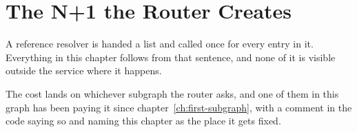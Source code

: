 \chapter{The N+1 the Router Creates}
\label{ch:router-n-plus-1}

A reference resolver is handed a list and called once for every entry in it.
Everything in this chapter follows from that sentence, and none of it is
visible outside the service where it happens.

The cost lands on whichever subgraph the router asks, and one of them in this
graph has been paying it since chapter~\ref{ch:first-subgraph}, with a comment
in the code saying so and naming this chapter as the place it gets fixed.







